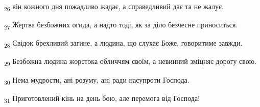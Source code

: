 \begin{tcolorbox}
\textsubscript{26} він кожного дня пожадливо жадає, а справедливий дає та не жалує.
\end{tcolorbox}
\begin{tcolorbox}
\textsubscript{27} Жертва безбожних огида, а надто тоді, як за діло безчесне приноситься.
\end{tcolorbox}
\begin{tcolorbox}
\textsubscript{28} Свідок брехливий загине, а людина, що слухає Боже, говоритиме завжди.
\end{tcolorbox}
\begin{tcolorbox}
\textsubscript{29} Безбожна людина жорстока обличчям своїм, а невинний зміцняє дорогу свою.
\end{tcolorbox}
\begin{tcolorbox}
\textsubscript{30} Нема мудрости, ані розуму, ані ради насупроти Господа.
\end{tcolorbox}
\begin{tcolorbox}
\textsubscript{31} Приготовлений кінь на день бою, але перемога від Господа!
\end{tcolorbox}
